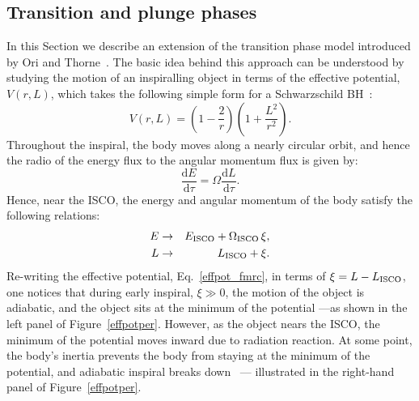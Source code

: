 \documentclass[aps,prd,showpacs,amssymb,floatfix,nofootinbib,superscriptaddress]{revtex4-1}%
\begin{document}
\subsection{Transition and plunge phases}
\label{trans}
In this Section we describe an extension of the transition phase model introduced by Ori and Thorne~\cite{amos}. The basic idea behind this approach can be understood by studying the motion of an inspiralling object in terms of the effective potential, \(V(r, L)\), which takes the following simple form for  a Schwarzschild BH~\cite{MTW}:
\begin{equation}
V(r, L) = \left(1-\frac{2}{r} \right)\left(1+ \frac{L^2}{r^2}\right).
\label{effpot_fmrc}
\end{equation} 
\noindent Throughout the inspiral, the body moves along a nearly circular orbit, and hence the radio of the energy flux to the angular momentum flux is given by:
\begin{equation}
 \frac{{\mathrm{d}}E}{{\mathrm{d}}\tau} = \Omega  \frac{{\mathrm{d}}L}{{\mathrm{d}}\tau}.
 \label{radII}
 \end{equation}
\noindent Hence, near the ISCO, the energy and angular momentum of the body satisfy the following relations:
\begin{eqnarray}
\label{ener_emri}
E & \rightarrow & E_{\rm{ISCO}} + \Omega_{\rm{ISCO}}\, \xi,\\
\label{ang_emri}
L  & \rightarrow & L_{\rm{ISCO}}+  \xi.
\end{eqnarray}
\noindent Re-writing the effective potential, Eq.~\eqref{effpot_fmrc}, in terms of \(\xi = L-L_{\rm{ISCO}}\), one notices that during early inspiral, \(\xi \gg0\), the motion of the object is adiabatic, and the object sits at the minimum of the potential ---as shown in the left panel of Figure~\ref{effpotper}. However, as the object nears the ISCO, the minimum of the potential moves inward due to radiation reaction. At some point, the body's inertia prevents the body from staying at the minimum of the potential, and adiabatic inspiral breaks down~\cite{amos} --- illustrated in the right-hand panel of Figure~\ref{effpotper}.
\end{document}
